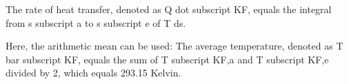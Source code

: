 The rate of heat transfer, denoted as Q dot subscript KF, equals the integral from s subscript a to s subscript e of T ds.

Here, the arithmetic mean can be used:
The average temperature, denoted as T bar subscript KF, equals the sum of T subscript KF,a and T subscript KF,e divided by 2, which equals 293.15 Kelvin.